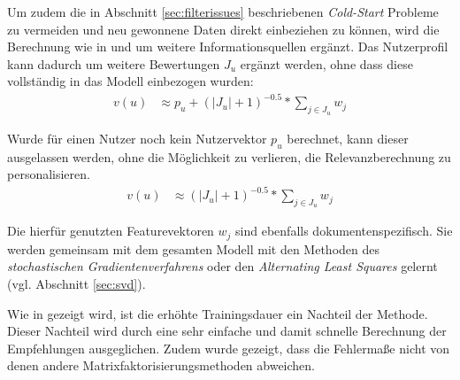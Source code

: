 Um zudem die in Abschnitt \ref{sec:filterissues} beschriebenen \textit{Cold-Start} Probleme zu vermeiden und neu gewonnene Daten direkt einbeziehen zu können, wird die Berechnung wie in \citep{Paterek07} und \citep{Koren:2009:MFT:1608565.1608614} um weitere Informationsquellen ergänzt. Das Nutzerprofil kann dadurch um weitere Bewertungen $J_u$ ergänzt werden, ohne dass diese vollständig in das Modell einbezogen wurden:
\begin{align}
v(u) & \approx p_u  +(|J_u|+1)^{-0.5}*\sum_{j \in J_u} w_{j} \label{form:anonuser_nsvd}
\end{align}

Wurde für einen Nutzer noch kein Nutzervektor $p_u$ berechnet, kann dieser ausgelassen werden, ohne die Möglichkeit zu verlieren, die Relevanzberechnung zu personalisieren.
\begin{align}
v(u) & \approx (|J_u|+1)^{-0.5}*\sum_{j \in J_u} w_{j} \label{form:anonuser_nsvd2}
\end{align}

Die hierfür genutzten Featurevektoren $w_j$ sind ebenfalls dokumentenspezifisch. Sie werden gemeinsam mit dem gesamten Modell mit den Methoden des \textit{stochastischen Gradientenverfahrens} oder den \textit{Alternating Least Squares} gelernt (vgl. Abschnitt \ref{sec:svd}).  \citep{Paterek07,Koren:2009:MFT:1608565.1608614}

Wie in \citep{Cacheda2011} gezeigt wird, ist die erhöhte Trainingsdauer ein Nachteil der Methode. Dieser Nachteil wird durch eine sehr einfache und damit schnelle Berechnung der Empfehlungen ausgeglichen. Zudem wurde gezeigt, dass die Fehlermaße nicht von denen andere Matrixfaktorisierungsmethoden abweichen. \citep{Cacheda2011}
 \newpage
